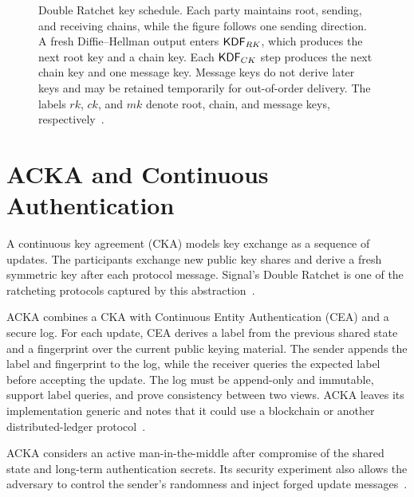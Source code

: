 \begin{figure}[H]
\centering

\caption[Double Ratchet key schedule.]{Double Ratchet key schedule. Each party maintains root,
sending, and receiving chains, while the figure follows one sending direction. A fresh
Diffie--Hellman output enters $\mathsf{KDF}_{RK}$, which produces the next root key and a chain key.
Each $\mathsf{KDF}_{CK}$ step produces the next chain key and one message
key. Message keys do not derive later keys and may be
retained temporarily for out-of-order delivery. The
labels $rk$, $ck$, and $mk$ denote root, chain, and message keys,
respectively~\cite[Sections~2.1--2.6]{doubleratchet}.}
\label{fig:bg-ratchet}
\end{figure}

\section{ACKA and Continuous Authentication}\label{sec:ext-acka}

A continuous key agreement (CKA) models key exchange as a sequence of updates. The participants
exchange new public key shares and derive a fresh symmetric key after each protocol
message. Signal's Double Ratchet is one of the ratcheting protocols
captured by this abstraction~\cite{dowling2023acka}.

ACKA combines a CKA with Continuous Entity Authentication (CEA) and a secure log. For each update,
CEA derives a label from the previous shared state and a fingerprint over the current public
keying material. The sender appends the label and fingerprint to the log, while the receiver queries
the expected label before accepting the update. The
log must be append-only and immutable, support label queries, and prove consistency between two
views. ACKA leaves its implementation generic and notes that it could use a blockchain or another
distributed-ledger protocol~\cite{dowling2023acka}.

ACKA considers an active man-in-the-middle after compromise of the shared state and long-term
authentication secrets. Its security experiment also allows the
adversary to control the sender's randomness and inject forged update
messages~\cite{dowling2023acka}.

